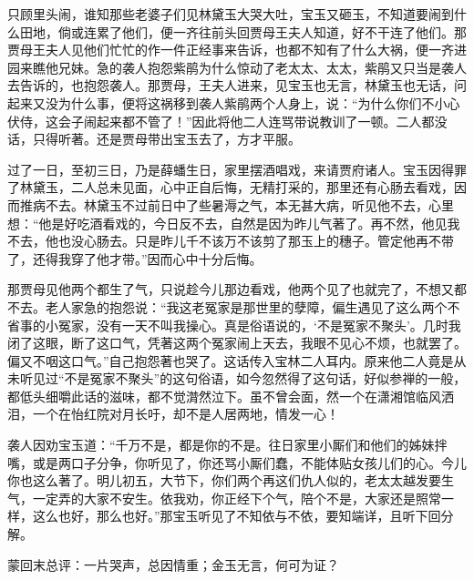 \begin{parag}


    只顾里头闹，谁知那些老婆子们见林黛玉大哭大吐，宝玉又砸玉，不知道要闹到什么田地，倘或连累了他们，便一齐往前头回贾母王夫人知道，好不干连了他们。那贾母王夫人见他们忙忙的作一件正经事来告诉，也都不知有了什么大祸，便一齐进园来瞧他兄妹。急的袭人抱怨紫鹃为什么惊动了老太太、太太，紫鹃又只当是袭人去告诉的，也抱怨袭人。那贾母，王夫人进来，见宝玉也无言，林黛玉也无话，问起来又没为什么事，便将这祸移到袭人紫鹃两个人身上，说：“为什么你们不小心伏侍，这会子闹起来都不管了！”因此将他二人连骂带说教训了一顿。二人都没话，只得听著。还是贾母带出宝玉去了，方才平服。
\end{parag}


\begin{parag}


    过了一日，至初三日，乃是薛蟠生日，家里摆酒唱戏，来请贾府诸人。宝玉因得罪了林黛玉，二人总未见面，心中正自后悔，无精打采的，那里还有心肠去看戏，因而推病不去。林黛玉不过前日中了些暑溽之气，本无甚大病，听见他不去，心里想：“他是好吃酒看戏的，今日反不去，自然是因为昨儿气著了。再不然，他见我不去，他也没心肠去。只是昨儿千不该万不该剪了那玉上的穗子。管定他再不带了，还得我穿了他才带。”因而心中十分后悔。
\end{parag}


\begin{parag}


    那贾母见他两个都生了气，只说趁今儿那边看戏，他两个见了也就完了，不想又都不去。老人家急的抱怨说：“我这老冤家是那世里的孽障，偏生遇见了这么两个不省事的小冤家，没有一天不叫我操心。真是俗语说的，‘不是冤家不聚头’。几时我闭了这眼，断了这口气，凭著这两个冤家闹上天去，我眼不见心不烦，也就罢了。偏又不咽这口气。”自己抱怨著也哭了。这话传入宝林二人耳内。原来他二人竟是从未听见过“不是冤家不聚头”的这句俗语，如今忽然得了这句话，好似参禅的一般，都低头细嚼此话的滋味，都不觉潸然泣下。虽不曾会面，然一个在潇湘馆临风洒泪，一个在怡红院对月长吁，却不是人居两地，情发一心！
\end{parag}


\begin{parag}


    袭人因劝宝玉道：“千万不是，都是你的不是。往日家里小厮们和他们的姊妹拌嘴，或是两口子分争，你听见了，你还骂小厮们蠢，不能体贴女孩儿们的心。今儿你也这么著了。明儿初五，大节下，你们两个再这们仇人似的，老太太越发要生气，一定弄的大家不安生。依我劝，你正经下个气，陪个不是，大家还是照常一样，这么也好，那么也好。”那宝玉听见了不知依与不依，要知端详，且听下回分解。
\end{parag}

\begin{parag}

    \begin{note}蒙回末总评：一片哭声，总因情重；金玉无言，何可为证？\end{note}
\end{parag}

